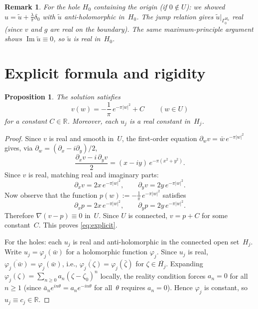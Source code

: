 \documentclass[11pt]{article}
\newtheorem{proposition}[theorem]{Proposition}
\newtheorem{remark}[theorem]{Remark}
\newcommand{\R}{\mathbb R}
\newcommand{\1}{\mathbf 1}
\newcommand{\pw}{\partial_w}
\begin{document}
\begin{remark}
For the hole \(H_0\) containing the origin (if \(0\notin U\)): we showed
\(u=\tilde u+\frac\lambda\pi\delta_0\) with \(\tilde u\) anti-holomorphic in~\(H_0\).
The jump relation gives \(\tilde u|_{\Gamma_0^{H_0}}\) real (since \(v\) and \(g\) are
real on the boundary). The same maximum-principle argument shows
\(\operatorname{Im}\tilde u\equiv 0\), so \(\tilde u\) is real in~\(H_0\).
\end{remark}

\section{Explicit formula and rigidity}

\begin{proposition}\label{prop:explicit}
The solution satisfies
\begin{equation}\label{eq:explicit}
v(w)=-\frac1\pi\,e^{-\pi|w|^2}+C
\qquad(w\in U)
\end{equation}
for a constant \(C\in\R\). Moreover, each \(u_j\) is a real constant in~\(H_j\).
\end{proposition}

\begin{proof}
Since \(v\) is real and smooth in~\(U\), the first-order equation
\(\pw v=\bar w\,e^{-\pi|w|^2}\) gives, via
\(\pw=(\partial_x-i\partial_y)/2\),
\[
\frac{\partial_x v-i\,\partial_y v}2
=
(x-iy)\,e^{-\pi(x^2+y^2)}.
\]
Since \(v\) is real, matching real and imaginary parts:
\begin{equation}\label{eq:gradient}
\partial_x v=2x\,e^{-\pi|w|^2},
\qquad
\partial_y v=2y\,e^{-\pi|w|^2}.
\end{equation}
Now observe that the function \(p(w):=-\frac1\pi\,e^{-\pi|w|^2}\) satisfies
\[
\partial_x p=2x\,e^{-\pi|w|^2},
\qquad
\partial_y p=2y\,e^{-\pi|w|^2}.
\]
Therefore \(\nabla(v-p)\equiv 0\) in~\(U\). Since \(U\) is connected, \(v=p+C\) for
some constant~\(C\). This proves \eqref{eq:explicit}.

For the holes: each \(u_j\) is real and anti-holomorphic in the connected open set~\(H_j\).
Write \(u_j=\varphi_j(\bar w)\) for a holomorphic function \(\varphi_j\). Since \(u_j\)
is real,
\(\overline{\varphi_j(\bar w)}=\varphi_j(\bar w)\), i.e.,
\(\overline{\varphi_j(\zeta)}=\varphi_j(\bar\zeta)\) for \(\zeta\in\overline{H_j}\).
Expanding \(\varphi_j(\zeta)=\sum_{n\ge 0}a_n(\zeta-\zeta_0)^n\) locally, the reality
condition forces \(a_n=0\) for all \(n\ge 1\) (since
\(\bar a_n e^{in\theta}=a_n e^{-in\theta}\) for all~\(\theta\) requires
\(a_n=0\)). Hence \(\varphi_j\) is constant, so \(u_j\equiv c_j\in\R\).
\end{proof}
\end{document}
